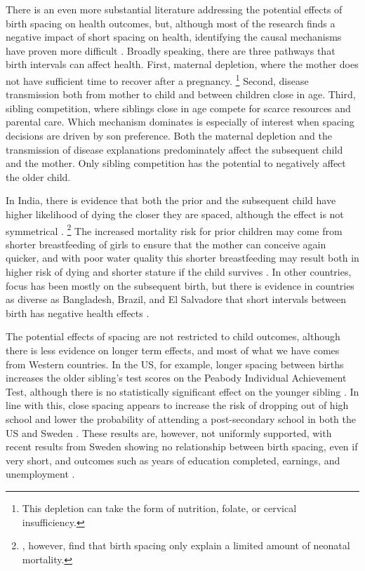 There is an even more substantial literature addressing the potential effects of birth 
spacing on health outcomes, but, although most of the research finds a negative impact of 
short spacing on health, identifying the causal mechanisms have proven more difficult
\citep{Conde-Agudelo2006,Conde-Agudelo2012}.
Broadly speaking, there are three pathways that birth intervals can affect health.
First, maternal depletion, where the mother does not have sufficient
time to recover after a pregnancy.%
\footnote{
This depletion can take the form of nutrition, folate, or cervical insufficiency.
}
Second, disease transmission both from mother to child and between children close in age.
Third, sibling competition, where siblings close in age compete for scarce resources and
parental care.
Which mechanism dominates is especially of interest when spacing decisions are driven by 
son preference.
Both the maternal depletion and the transmission of disease explanations predominately
affect the subsequent child and the mother.
Only sibling competition has the potential to negatively affect the older child.

In India, there is evidence that both the prior and the subsequent child have higher
likelihood of dying the closer they are spaced, although the effect is not symmetrical
\citep{Whitworth2002,Bhargava2003,Maitra2008,Makepeace2008}.%
\footnote{
\cite{Bhalotra2008}, however, find that birth spacing only explain a limited amount
of neonatal mortality.
}
The increased mortality risk for prior children may come from shorter breastfeeding of 
girls to ensure that the mother can conceive again quicker, and with poor water
quality this shorter breastfeeding may result both in higher risk of dying and shorter
stature if the child survives \citep{Jayachandran2011,Jayachandran2017a}.
In other countries, focus has been mostly on the subsequent birth, but there is evidence 
in countries as diverse as Bangladesh, Brazil, and El Salvadore that
short intervals between birth has negative health effects
\citep{Curtis1993,Davanzo2008,Gribble2009,Saha2013}.

The potential effects of spacing are not restricted to child outcomes, although
there is less evidence on longer term effects, and most of what we have comes from
Western countries.
In the US, for example, longer spacing between births increases the older sibling's
test scores on the Peabody Individual Achievement Test, although there is no
statistically significant effect on the younger sibling \citep{Buckles2012}.
In line with this, close spacing appears to increase the risk of dropping out of
high school and lower the probability of attending a post-secondary school in both the
US and Sweden \citep{Powell1993,Pettersson-Lidbom2009}.
These results are, however, not uniformly supported, with recent results from Sweden 
showing no relationship between birth spacing, even if very short, and outcomes such as 
years of education completed, earnings, and unemployment \citep{Barclay2017}.

